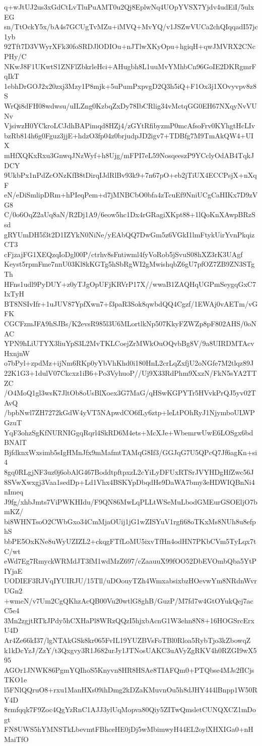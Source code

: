 q+wJtUJ2us3xGdCtLvTluPuAMT0u2Qj8EplwNq4UOpYVSX7Yjdv4udEiI/5ulxEG
sn/TtOckY5x/bA4s7GCUgTvMZu+iMVQ+MvYQ/v1JSZwVUCa2chQIqqadI57jc1yb
92Tft7D3VWyrXFk30foSRDJlODIOu+nJTlwXKyOpu+hgiqH+qwJMVRX2CNcPHy/C
NKwJ8F1UKwtS1ZNFlZbkrleHci+AHugbh8L1uuMvYMhbCn96GoIE2DKRgmrFqIkT
1ebhDrGOJ2x20zxj3Mzy1P8mjk+5uPumPxpvgD2Q3h5iQ+F1Ox3j1XOvyvpv8z8S
WrQi8dFH08wdwsu/uILZng0KzbqZxDy78IbCRlig34vMctqGG0EH67NXqyNvVUNv
VjsiwzH0YCkroLCJdhBAPimqd8HZj4/zGYtRfibyzmP0mcAfsoFrv0KYhgtHcLIv
bzRb814h6g0Fguz3jjE+hdzO3fp04z0brjudpJD2igv7+TDBfg7M9TmAkQW4+UIX
mHfXQKxRxu3GnwqJNzWyf+h8Ujg/mFPI7eL59NosqeeszP9YCclyOdAB4TqkJDCY
9UkbPx1nPdZcONzKfB8tDirqIJdRlBv93k9+7n67pO+eb2jTiUX4ECCPsjX+nXqF
eN/eDiSmlipDRm+hPIeqPem+d7jMNBCbO0bfa4zTcuEf9NniUCgCaHIKx7D9zVG8
C/0o6OqZ2aUq8aN/R2Dj1A9/6eow5hc1Dx4rGRagiXKpt88+1lQoKnXAwpBRzSsd
gRYUmDH5f3t2D1IZYkN0NiNe/yEAbQQ7DwGm5z6VGkI1lmFtykUirYvnPkqizCT3
cFjzajFG1XEQzqIoDgl00P/ctrhv8sFntiwml4fyVoRob5jSvuS08hXZ3rK3UAgf
Keyst5rpmFme7nnU03Kl8kKGTg5hSbRgWI2gMwishqbZ6gU7pfOZ7ZB9ZN3STgTh
HFns1udl9PyDUY+z0yTJgOpUFjKRVrP17X//wwaB1ZAQHqUGPmSeygqGxC7IxTyH
BT8NSIvIfr+1uJUV87YpfXwn7+f3paR3Sok8qwbdQQ4Cgzf/1EWAj0vAETm/vGFK
CGCFzmJFA9hSJBs/K2evsR985l3U6MLortlkNp507KkyFZWZp8pF802AHS/0oNAC
YPN9hLiUTYX3liuYpS3L2MvTKLCoejZrMWkOuOQvbBg8V/9a8UIRDMTAcvHxnjnW
o7bPyl+zpdMz+ijNm6RKp0yYbVhKhd0i180HnL2crLqZxfjU2oNGfe7M2tlqz89J
22K1G3+1dulV07Ckcxz1iB6+Po3VyhuoP//Uj9X33RdPhm9XxzN/FkN5sYA2TTZC
/O4MoQ1gl3wsK7JltOb8oUsBlXoex3G7MaG/qHSwKGPYTr5HVvkPrQJ5yv02TAvQ
/bpbNwl7ZH7272kGdW4yVT5NApwdCO6fLy6ztp+leLtPOhRyJ1NjymboULWPGzuT
YqF3ohzSgKfNURNIGgqRqrl4SkRD6M4ets+McXJe+WbemrwUwE6LOSgx6bdBNAlT
BjfdknxWxsimb5sIgHMnJfx9mMafmtTAMqG8If3/GGJqG7U5QPcQ7Jf6agKn+si4
8gq0RLgjNF3uz0j6obAlG467BoddtpftpxzL2cYiLyDFUxRTSrJVYHDgHfZwc56J
8SVwXwxgj3Vaa1sedDp+Ld1Vhx4BSKYpDbqdHe9DaWA7bmy3eHDWIQBnNi4nImeq
J9fg/xhbJmts7ViPWKHIdu/F9QN86MwLqPLLtWSeMuLbodGMEurGSOEljO7bmKZ/
bi8WHNTsoO2CWbGxo34CmMjaOUij1jG1wZISYuV1rgfi68oTKxMs8NUh8u8efphS
bbPE5OxKNe8uWyUZIZL2+ckqgFTfLoMU5ixvTfHn4odHN7PKbCVm5TyLqx7tC/wt
eWd7Eg7RmyckWRMdJT3fM1wdMzZ697/cZaauuX99fOO52DbEVOmbQba5YtPIYjaE
UODIEF3RJVqIYUIRJU/15Tll/uDOouyTZh4WmxabsixbzHOevwYm8NRdnWvrUGn2
+wmeN/v7Um2CgQKhzAcQB00Vu20wtlG8ghB/GuzP/M7fd7w4GtOYukQej7acC5e4
3Mn2zgjtRTkJPdy5hCXHaPl8WRzQQzI5hjxbAcnG1W3ehn8N8+16HOGSrcErxU4D
Ar4Ze66kI37/lgNTAkGSk8kr065FvIL19YUZBVsFoTBl0Rloa5RybTjo3kZbowqZ
k1kDcYzJ/ZzY/t3Qxgvy3R1J682urJy1JTNosUAKC3uAVyZgRKV4h0RZGI9wX595
AGOr1JNWK86PgmYQIhoS5Knyvn8HR8HSAe8TIAFQm0+PTQbse4MJs2fICjsTKO1e
l5FNlQQruO8+rxu1ManHXs09ihDmg2kDZaKMuvnOu5h8dJHY444lBnpp1W50RY4D
8rmfqqk7F9Zoc4QgYzRnC1AJJ3ylUqMopva80Qiy5ZITwQmsletCUNQXCZ1mDogt
FN8UWS5hYMNSTkLbevmtFBhceHE0jDj5wMbimwyH44EL2oylXHXIGa0+nHMaiTfO
